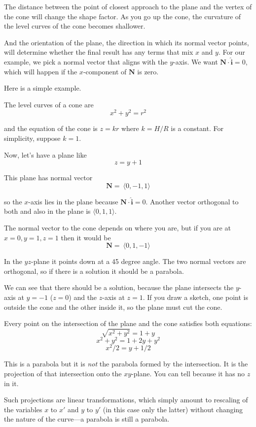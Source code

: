 \documentclass[11pt, oneside]{article}
\begin{document}
The distance between the point of closest approach to the plane and the vertex of the cone will change the shape factor.  As you go up the cone, the curvature of the level curves of the cone becomes shallower.

And the orientation of the plane, the direction in which its normal vector points, will determine whether the final result has any terms that mix $x$ and $y$.  For our example, we pick a normal vector that aligns with the $y$-axis.  We want $\mathbf{N} \cdot \mathbf{\hat{i}} = 0$, which will happen if the $x$-component of $\mathbf{N}$ is zero.

Here is a simple example.

The level curves of a cone are
\[ x^2 + y^2 = r^2 \]

and the equation of the cone is $z = kr$ where $k = H/R$ is a constant.  For simplicity, suppose $k = 1$.

Now, let's have a plane like
\[ z = y + 1 \]

This plane has normal vector
\[ \mathbf{N} = \ \langle 0, -1, 1 \rangle \]

so the $x$-axis lies in the plane because $\mathbf{N} \cdot \mathbf{\hat{i}} = 0$.  Another vector orthogonal to both and also in the plane is $\langle 0, 1, 1 \rangle$.

The normal vector to the cone depends on where you are, but if you are at $x=0, y=1, z=1$ then it would be
\[ \mathbf{N} = \ \langle 0, 1, -1 \rangle \]

In the $yz$-plane it points down at a 45 degree angle.  The two normal vectors are orthogonal, so if there is a solution it should be a parabola.

We can see that there should be a solution, because the plane intersects the $y$-axis at $y = -1$ ($z = 0$) and the $z$-axis at $z = 1$.  If you draw a sketch, one point is outside the cone and the other inside it, so the plane must cut the cone.

Every point on the intersection of the plane and the cone satisfies both equations:
\[ \sqrt{x^2 + y^2} = 1 + y \]
\[ x^2 + y^2 = 1 + 2y + y^2 \]
\[ x^2/2 = y + 1/2 \]

This is a parabola but it is \emph{not} the parabola formed by the intersection.  It is the projection of that intersection onto the $xy$-plane.  You can tell because it has no $z$ in it.

Such projections are linear transformations, which simply amount to rescaling of the variables $x$ to $x'$ and $y$ to $y'$ (in this case only the latter) without changing the nature of the curve---a parabola is still a parabola.  
\end{document}
